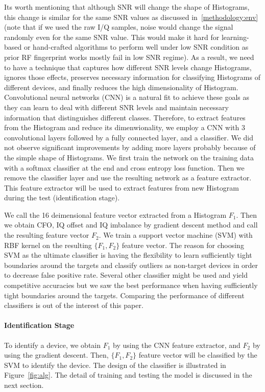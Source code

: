 Its worth mentioning that although SNR will change the shape of Histograms, this change is similar for the same SNR values as discussed in~\ref{methodology:env} (note that if we used the raw I/Q samples, noise would change the signal randomly even for the same SNR value. This would make it hard for learning-based or hand-crafted algorithms to perform well under low SNR condition as prior RF fingerprint works mostly fail in low SNR regime). As a result, we need to have a technique that captures how different SNR levels change Histograms, ignores those effects, preserves necessary information for classifying Histograms of different devices, and finally reduces the high dimensionality of Histogram. Convolutional neural networks (CNN) is a natural fit to achieve these goals as they can learn to deal with different SNR levels and maintain necessary information that distinguishes different classes. Therefore, to extract features from the Histogram and reduce its dimenwionality, we employ a CNN with 3 convolutional layers followed by a fully connected layer, and a classifier. We did not observe significant improvements by adding more layers probably because of the simple shape of Histograms. We first train the network on the training data with a softmax classifier at the end and cross entropy loss function. Then we remove the classifier layer and use the resulting network as a feature extractor. This feature extractor will be used to extract features from new Histogram during the test (identification stage).

We call the 16 deimensional feature vector extracted from a Histogram $F_1$.  Then we obtain CFO, IQ offset and IQ imbalance by gradient descent method and call the resulting feature vector $F_2$. We train a support vector machine (SVM) with RBF kernel on the resulting $\{F_1,F_2\}$ feature vector. The reason for choosing SVM as the ultimate classifier is having the flexibility to learn sufficiently tight boundaries around the targets and classify outliers as non-target devices in order to decrease false positive rate. Several other classifier might be used and yield competitive accuracies but we saw the best performance when having sufficiently tight boundaries around the targets. Comparing the performance of different classifiers is out of the interest of this paper.


\paragraph{Identification Stage}
To identify a device, we obtain $F_1$ by using the CNN feature extractor, and $F_2$ by using the gradient descent. Then, $\{F_1,F_2\}$ feature vector will be classified by the SVM to identify the device. The design of the classifier is illustrated in Figure~\ref{fig:alg}. The detail of training and testing the model is discussed in the next section. 

